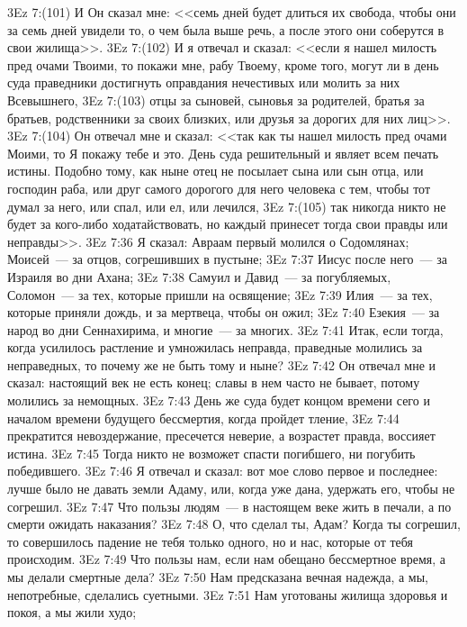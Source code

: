 \vs 3Ez 7:(101) И Он сказал мне: <<семь дней будет длиться их свобода, чтобы они за семь дней увидели то, о чем была выше речь, а после этого они соберутся в свои жилища>>.
\vs 3Ez 7:(102) И я отвечал и сказал: <<если я нашел милость пред очами Твоими, то покажи мне, рабу Твоему, кроме того, могут ли в день суда праведники достигнуть оправдания нечестивых или молить за них Всевышнего,
\vs 3Ez 7:(103) отцы за сыновей, сыновья за родителей, братья за братьев, родственники за своих близких, или друзья за дорогих для них лиц>>.
\vs 3Ez 7:(104) Он отвечал мне и сказал: <<так как ты нашел милость пред очами Моими, то Я покажу тебе и это. День суда решительный и являет всем печать истины. Подобно тому, как ныне отец не посылает сына или сын отца, или господин раба, или друг самого дорогого для него человека с тем, чтобы тот думал за него, или спал, или ел, или лечился,
\vs 3Ez 7:(105) так никогда никто не будет за кого-либо ходатайствовать, но каждый принесет тогда свои правды или неправды>>.
\vs 3Ez 7:36 Я сказал: Авраам первый молился о Содомлянах; Моисей~--- за отцов, согрешивших в пустыне;
\vs 3Ez 7:37 Иисус после него~--- за Израиля во дни Ахана;
\vs 3Ez 7:38 Самуил и Давид~--- за погубляемых, Соломон~--- за тех, которые пришли на освящение;
\vs 3Ez 7:39 Илия~--- за тех, которые приняли дождь, и за мертвеца, чтобы он ожил;
\vs 3Ez 7:40 Езекия~--- за народ во дни Сеннахирима, и многие~--- за многих.
\vs 3Ez 7:41 Итак, если тогда, когда усилилось растление и умножилась неправда, праведные молились за неправедных, то почему же не быть тому и ныне?
\vs 3Ez 7:42 Он отвечал мне и сказал: настоящий век не есть конец; славы в нем часто не бывает, потому молились за немощных.
\vs 3Ez 7:43 День же суда будет концом времени сего и началом времени будущего бессмертия, когда пройдет тление,
\vs 3Ez 7:44 прекратится невоздержание, пресечется неверие, а возрастет правда, воссияет истина.
\vs 3Ez 7:45 Тогда никто не возможет спасти погибшего, ни погубить победившего.
\vs 3Ez 7:46 Я отвечал и сказал: вот мое слово первое и последнее: лучше было не давать земли Адаму, или, когда уже дана, удержать его, чтобы не согрешил.
\vs 3Ez 7:47 Что пользы людям~--- в настоящем веке жить в печали, а по смерти ожидать наказания?
\vs 3Ez 7:48 О, что сделал ты, Адам? Когда ты согрешил, то совершилось падение не тебя только одного, но и нас, которые от тебя происходим.
\vs 3Ez 7:49 Что пользы нам, если нам обещано бессмертное время, а мы делали смертные дела?
\vs 3Ez 7:50 Нам предсказана вечная надежда, а мы, непотребные, сделались суетными.
\vs 3Ez 7:51 Нам уготованы жилища здоровья и покоя, а мы жили худо;
